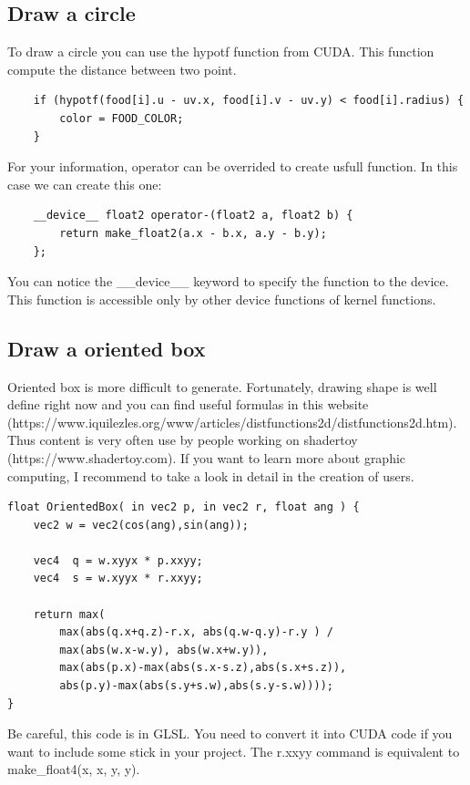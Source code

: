 \documentclass{article}
\begin{document}
\subsection{Draw a circle}
To draw a circle you can use the hypotf function from CUDA. This function compute the distance between two point. 
\begin{lstlisting}
	if (hypotf(food[i].u - uv.x, food[i].v - uv.y) < food[i].radius) {
		color = FOOD_COLOR;
	}
\end{lstlisting}
For your information, operator can be overrided to create usfull function. In this case we can create this one:
\begin{lstlisting}
	__device__ float2 operator-(float2 a, float2 b) {
		return make_float2(a.x - b.x, a.y - b.y);
	};
\end{lstlisting}
You can notice the \_\_device\_\_ keyword to specify the function to the device. This function is accessible only by other device functions of kernel functions.

\subsection{Draw a oriented box}
Oriented box is more difficult to generate. Fortunately, drawing shape is well define right now and you can find useful formulas in this website (https://www.iquilezles.org/www/articles/distfunctions2d/distfunctions2d.htm). Thus content is very often use by people working on shadertoy (https://www.shadertoy.com). If you want to learn more about graphic computing, I recommend to take a look in detail in the creation of users.
\begin{lstlisting}
float OrientedBox( in vec2 p, in vec2 r, float ang ) {
    vec2 w = vec2(cos(ang),sin(ang));

    vec4  q = w.xyyx * p.xxyy;
    vec4  s = w.xyyx * r.xxyy;

    return max(
        max(abs(q.x+q.z)-r.x, abs(q.w-q.y)-r.y ) /
        max(abs(w.x-w.y), abs(w.x+w.y)),
        max(abs(p.x)-max(abs(s.x-s.z),abs(s.x+s.z)),
        abs(p.y)-max(abs(s.y+s.w),abs(s.y-s.w))));
}
\end{lstlisting}
Be careful, this code is in GLSL. You need to convert it into CUDA code if you want to include some stick in your project. The r.xxyy command is equivalent to make\_float4(x, x, y, y).
\end{document}
